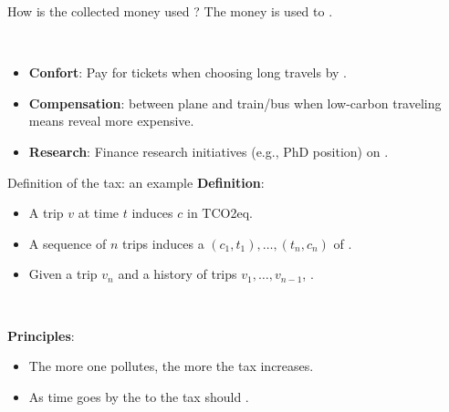 \documentclass[french, english]{beamer}
\begin{document}
\begin{frame}{How is the collected money used ?}
The money is used to .

\

\begin{itemize} 
    \item \textbf{Confort}: Pay for  tickets when choosing long travels by . 
    \item \textbf{Compensation}:  between plane and train/bus when low-carbon traveling means reveal more expensive.  
    \item \textbf{Research}: Finance research initiatives (e.g., PhD position) on .
\end{itemize}	
\end{frame}

\begin{frame}{Definition of the tax: an example}
\textbf{Definition}:
\begin{itemize}
\item A trip $v$ at time $t$ induces  $c$ in TCO2eq.
\item A sequence of $n$ trips induces a  $(c_1,t_1),\ldots,(t_n,c_n)$ of .
\item Given a trip $v_n$ and a history of trips $v_1,\ldots, v_{n-1}$, .  
\end{itemize}

\

\textbf{Principles}:
\begin{itemize}
\item The more one pollutes, the more the tax increases. 
\item As time goes by the  to the tax should .
\end{itemize}
\end{frame}
\end{document}
